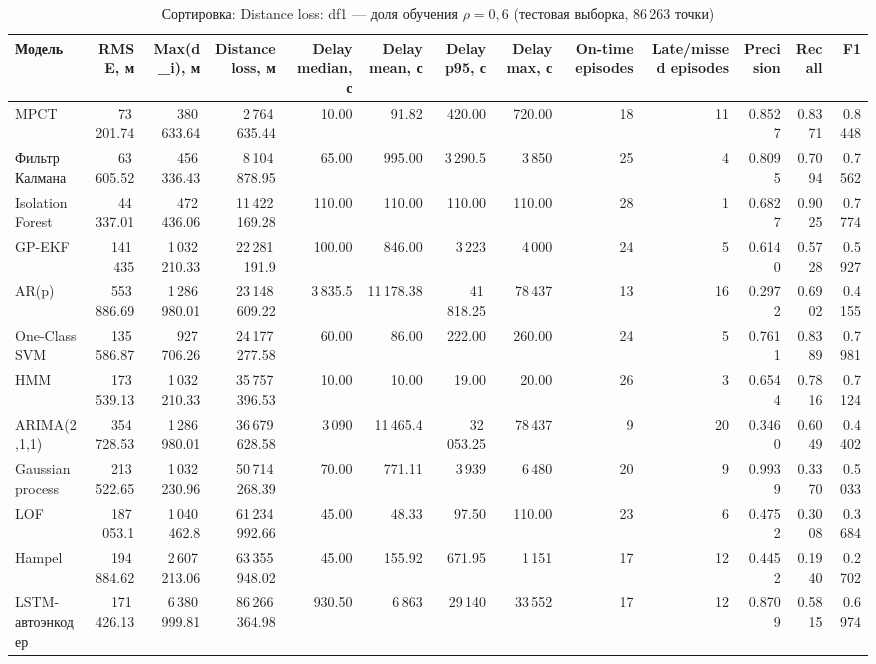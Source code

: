 \documentclass[a4paper,12pt]{report}
\begin{document}
\begin{table}[H]
\centering
\scriptsize
\setlength{\tabcolsep}{3pt}
\caption{Сортировка: Distance loss: df1 — доля обучения $\rho=0{,}6$ (тестовая выборка, 86\,263 точки)}
\begin{tabular}{lrrrrrrrrrrrr}
\toprule
Модель & RMSE, м & Max(d\_i), м & Distance loss, м & Delay median, с & Delay mean, с & Delay p95, с & Delay max, с & On-time episodes & Late/missed episodes & Precision & Recall & F1 \\
\midrule
MPCT & 73\,201.74 & 380\,633.64 & 2\,764\,635.44 & 10.00 & 91.82 & 420.00 & 720.00 & 18 & 11 & 0.8527 & 0.8371 & 0.8448 \\
Фильтр Калмана & 63\,605.52 & 456\,336.43 & 8\,104\,878.95 & 65.00 & 995.00 & 3\,290.5 & 3\,850 & 25 & 4 & 0.8095 & 0.7094 & 0.7562 \\
Isolation Forest & 44\,337.01 & 472\,436.06 & 11\,422\,169.28 & 110.00 & 110.00 & 110.00 & 110.00 & 28 & 1 & 0.6827 & 0.9025 & 0.7774 \\
GP-EKF & 141\,435 & 1\,032\,210.33 & 22\,281\,191.9 & 100.00 & 846.00 & 3\,223 & 4\,000 & 24 & 5 & 0.6140 & 0.5728 & 0.5927 \\
AR(p) & 553\,886.69 & 1\,286\,980.01 & 23\,148\,609.22 & 3\,835.5 & 11\,178.38 & 41\,818.25 & 78\,437 & 13 & 16 & 0.2972 & 0.6902 & 0.4155 \\
One-Class SVM & 135\,586.87 & 927\,706.26 & 24\,177\,277.58 & 60.00 & 86.00 & 222.00 & 260.00 & 24 & 5 & 0.7611 & 0.8389 & 0.7981 \\
HMM & 173\,539.13 & 1\,032\,210.33 & 35\,757\,396.53 & 10.00 & 10.00 & 19.00 & 20.00 & 26 & 3 & 0.6544 & 0.7816 & 0.7124 \\
ARIMA(2,1,1) & 354\,728.53 & 1\,286\,980.01 & 36\,679\,628.58 & 3\,090 & 11\,465.4 & 32\,053.25 & 78\,437 & 9 & 20 & 0.3460 & 0.6049 & 0.4402 \\
Gaussian process & 213\,522.65 & 1\,032\,230.96 & 50\,714\,268.39 & 70.00 & 771.11 & 3\,939 & 6\,480 & 20 & 9 & 0.9939 & 0.3370 & 0.5033 \\
LOF & 187\,053.1 & 1\,040\,462.8 & 61\,234\,992.66 & 45.00 & 48.33 & 97.50 & 110.00 & 23 & 6 & 0.4752 & 0.3008 & 0.3684 \\
Hampel & 194\,884.62 & 2\,607\,213.06 & 63\,355\,948.02 & 45.00 & 155.92 & 671.95 & 1\,151 & 17 & 12 & 0.4452 & 0.1940 & 0.2702 \\
LSTM-автоэнкодер & 171\,426.13 & 6\,380\,999.81 & 86\,266\,364.98 & 930.50 & 6\,863 & 29\,140 & 33\,552 & 17 & 12 & 0.8709 & 0.5815 & 0.6974 \\

\end{tabular}
\end{table}
\end{document}
